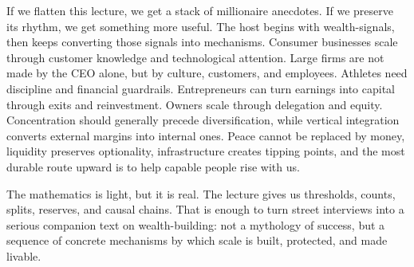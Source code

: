 If we flatten this lecture, we get a stack of millionaire anecdotes. If we preserve its rhythm, we get something more useful. The host begins with wealth-signals, then keeps converting those signals into mechanisms. Consumer businesses scale through customer knowledge and technological attention. Large firms are not made by the CEO alone, but by culture, customers, and employees. Athletes need discipline and financial guardrails. Entrepreneurs can turn earnings into capital through exits and reinvestment. Owners scale through delegation and equity. Concentration should generally precede diversification, while vertical integration converts external margins into internal ones. Peace cannot be replaced by money, liquidity preserves optionality, infrastructure creates tipping points, and the most durable route upward is to help capable people rise with us.

The mathematics is light, but it is real. The lecture gives us thresholds, counts, splits, reserves, and causal chains. That is enough to turn street interviews into a serious companion text on wealth-building: not a mythology of success, but a sequence of concrete mechanisms by which scale is built, protected, and made livable.